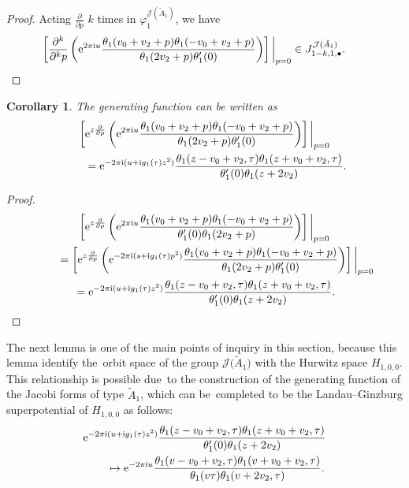 \documentclass[10pt,a4paper]{amsart}
\numberwithin{equation}{section}
\newtheorem{Corollary}[Theorem]{Corollary}
\newcommand{\Ja}{\mathcal{J}}
\begin{document}
\begin{proof}
Acting $\frac{\partial}{\partial p}$ $k$ times in $\varphi_1^{\Ja(\tilde A_1)}$, we have
\begin{gather*}
\left[ \frac{\partial^k}{\partial ^k p}\left({\rm e}^{2\pi {\rm i} u}\frac{\theta_1(v_0+v_2+p)\theta_1(-v_0+v_2+p)}{\theta_1(2v_2+p)\theta_1^{\prime}(0)}\right) \right]
\bigg |_{p=0} \in J_{1-k,1,\bullet}^{\Ja(\tilde A_1)}.
\tag*{\qed}
\end{gather*}
\renewcommand{\qed}{}
\end{proof}

\begin{Corollary}
The generating function can be written as
\begin{gather*}
\left[ {\rm e}^{z\frac{\partial}{\partial p} } \left({\rm e}^{2\pi {\rm i} u}\frac{\theta_1(v_0+v_2+p)
\theta_1(-v_0+v_2+p)}{\theta_1(2v_2+p)\theta_1^{\prime}(0)}\right) \right]\bigg |_{p=0}\nonumber
\\ \qquad
{}={\rm e}^{-2\pi {\rm i}(u+ {\rm i}g_1(\tau)z^2)}\frac{\theta_1(z-v_0+v_2,\tau)\theta_1(z+v_0+v_2,\tau)}{\theta_1^{\prime}(0)\theta_1(z+2v_2)}.
\end{gather*}
\end{Corollary}

\begin{proof}
\begin{gather*}
\left[ {\rm e}^{z\frac{\partial}{\partial p} } \left({\rm e}^{2\pi {\rm i} u}\frac{\theta_1(v_0+v_2+p)
\theta_1(-v_0+v_2+p)}{\theta_1^{\prime}(0)\theta_1(2v_2+p)}\right) \right]\bigg |_{p=0}
\\ \qquad
{}=\left[ {\rm e}^{z\frac{\partial}{\partial p} } \left({\rm e}^{-2\pi {\rm i}(s+ {\rm i}g_1(\tau)p^2)}
\frac{\theta_1(v_0+v_2+p)\theta_1(-v_0+v_2+p)}{\theta_1(2v_2+p)\theta_1^{\prime}(0)}\right) \right]\bigg |_{p=0}
\\ \qquad
{}={\rm e}^{-2\pi {\rm i}(u+ {\rm i}g_1(\tau)z^2)}\frac{\theta_1(z-v_0+v_2,\tau) \theta_1(z+v_0+v_2,\tau)}{\theta_1^{\prime}(0)\theta_1(z+2v_2)}.\tag*{\qed}
\end{gather*}
\renewcommand{\qed}{}
\end{proof}

The next lemma is one of the main points of inquiry in this section, because this lemma identify the~orbit space of the group $\Ja\big(\tilde A_1\big)$ with the Hurwitz space $H_{1,0,0}$. This relationship is possible due~to the construction of the generating function of the Jacobi forms of type $\tilde A_1$, which can be~completed to be the Landau--Ginzburg superpotential of $H_{1,0,0}$ as follows:
\begin{gather*}
{\rm e}^{-2\pi {\rm i}(u+ {\rm i}g_1(\tau)z^2)}\frac{\theta_1(z-v_0+v_2,\tau)\theta_1(z+v_0+v_2,\tau)}
{\theta_1^{\prime}(0)\theta_1(z+2v_2)}
\\ \qquad{}
\mapsto {\rm e}^{-2\pi {\rm i} u}\frac{\theta_1(v-v_0+v_2,\tau) \theta_1(v+v_0+v_2,\tau)}{\theta_1(v\tau)\theta_1(v+2v_2,\tau)}.
\end{gather*}
\end{document}
